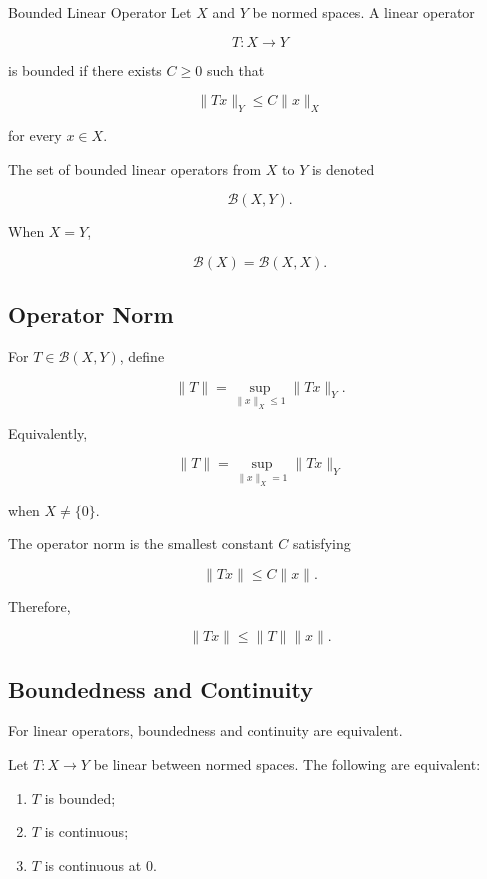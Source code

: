 \begin{definitionbox}{Bounded Linear Operator}
Let \(X\) and \(Y\) be normed spaces. A linear operator

\[
T:X\to Y
\]

is bounded if there exists \(C\geq0\) such that

\[
\boxed{
\|Tx\|_Y
\leq
C\|x\|_X
}
\]

for every \(x\in X\).
\end{definitionbox}

The set of bounded linear operators from \(X\) to \(Y\) is denoted

\[
\boxed{
\mathcal{B}(X,Y).
}
\]

When \(X=Y\),

\[
\boxed{
\mathcal{B}(X)
=
\mathcal{B}(X,X).
}
\]

\subsection{Operator Norm}
\label{subsec:operator-norm}

For \(T\in\mathcal{B}(X,Y)\), define

\[
\boxed{
\|T\|
=
\sup_{\|x\|_X\leq1}
\|Tx\|_Y.
}
\]

Equivalently,

\[
\boxed{
\|T\|
=
\sup_{\|x\|_X=1}
\|Tx\|_Y
}
\]

when \(X\neq\{0\}\).

The operator norm is the smallest constant \(C\) satisfying

\[
\boxed{
\|Tx\|
\leq
C\|x\|.
}
\]

Therefore,

\[
\boxed{
\|Tx\|
\leq
\|T\|\|x\|.
}
\]

\subsection{Boundedness and Continuity}
\label{subsec:boundedness-continuity-operators}

For linear operators, boundedness and continuity are equivalent.

\begin{theorem}
Let \(T:X\to Y\) be linear between normed spaces. The following are
equivalent:
\begin{enumerate}
    \item \(T\) is bounded;
    \item \(T\) is continuous;
    \item \(T\) is continuous at \(0\).
\end{enumerate}
\end{theorem}

